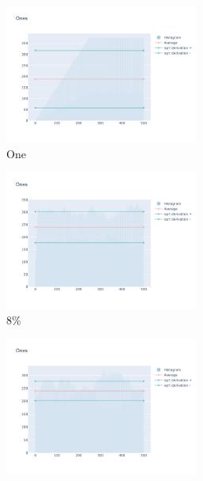 \documentclass[12pt, fleqn]{report}                             %
\theoremstyle{break}                                            %
\begin{document}
        \begin{figure}[h!]
          \centering
          \begin{subfigure}[b]{0.4\linewidth}
            \includegraphics[width=0.7\textwidth]{Images/54/dia-a.png}
            \caption{One}
          \end{subfigure}
          \begin{subfigure}[b]{0.4\linewidth}
            \includegraphics[width=0.7\textwidth]{Images/54/dia-b.png}
            \caption{8\%}
          \end{subfigure}
          \begin{subfigure}[b]{0.4\linewidth}
            \includegraphics[width=0.7\textwidth]{Images/54/dia-c.png}

\end{subfigure}
\end{figure}
\end{document}

